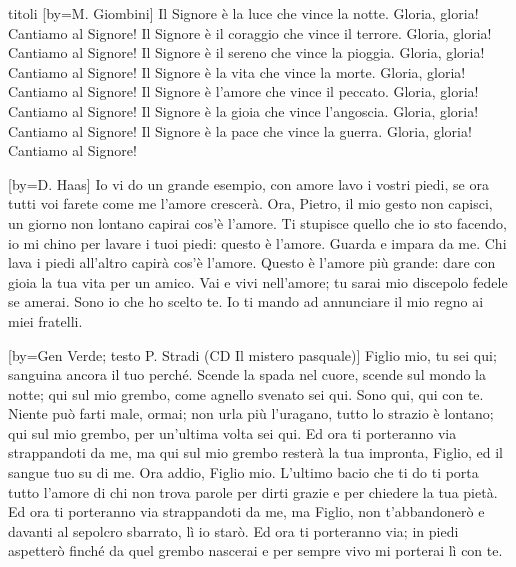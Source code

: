 \begin{songs}{titoli}
[by={M. Giombini}]
\beginverse
Il Signore è la luce che vince la notte.
Gloria, gloria! Cantiamo al Signore!
\endverse
\beginverse
Il Signore è il coraggio che vince il terrore.
Gloria, gloria! Cantiamo al Signore!
\endverse
\beginverse
Il Signore è il sereno che vince la pioggia.
Gloria, gloria! Cantiamo al Signore!
\endverse
\beginverse
Il Signore è la vita che vince la morte.
Gloria, gloria! Cantiamo al Signore!
\endverse
\beginverse
Il Signore è l'amore che vince il peccato.
Gloria, gloria! Cantiamo al Signore!
\endverse
\beginverse
Il Signore è la gioia che vince l'angoscia.
Gloria, gloria! Cantiamo al Signore!
\endverse
\beginverse
Il Signore è la pace che vince la guerra.
Gloria, gloria! Cantiamo al Signore!
\endverse
\endsong

[by={D. Haas}]
\beginchorus
Io vi do un grande esempio, con amore lavo i vostri piedi,
se ora tutti voi farete come me l'amore crescerà.
\endchorus
\beginverse
Ora, Pietro, il mio gesto non capisci,
un giorno non lontano capirai
cos'è l'amore.
\endverse
\beginverse
Ti stupisce quello che io sto facendo,
io mi chino per lavare i tuoi piedi: questo è l'amore.
\endverse
\beginverse
Guarda e impara da me.
Chi lava i piedi all'altro capirà
cos'è l'amore.
\endverse
\beginverse
Questo è l'amore più grande:
dare con gioia la tua vita
per un amico.
\endverse
\beginverse
Vai e vivi nell'amore;
tu sarai mio discepolo fedele
se amerai.
\endverse
\beginverse
Sono io che ho scelto te.
Io ti mando ad annunciare il mio regno
ai miei fratelli.
\endverse
\endsong

[by={Gen Verde; testo P. Stradi (CD Il mistero pasquale)}]
\beginverse
Figlio mio, tu sei qui;
sanguina ancora il tuo perché.
Scende la spada nel cuore,
scende sul mondo la notte;
qui sul mio grembo,
come agnello svenato sei qui.
\endverse
\beginverse
Sono qui, qui con te.
Niente può farti male, ormai;
non urla più l'uragano,
tutto lo strazio è lontano;
qui sul mio grembo,
per un'ultima volta sei qui.
\endverse
\beginchorus
Ed ora ti porteranno via
strappandoti da me,
ma qui sul mio grembo resterà
la tua impronta, Figlio,
ed il sangue tuo su di me.
\endchorus
\beginverse
Ora addio, Figlio mio.
L'ultimo bacio che ti do
ti porta tutto l'amore
di chi non trova parole
per dirti grazie
e per chiedere la tua pietà.
\endverse
\beginchorus
Ed ora ti porteranno via
strappandoti da me,
ma Figlio, non t'abbandonerò
e davanti al sepolcro sbarrato, lì io starò.
\endchorus
\beginchorus
Ed ora ti porteranno via;
in piedi aspetterò
finché da quel grembo nascerai
e per sempre vivo mi porterai
lì con te.
\endchorus
\endsong


\end{songs}
